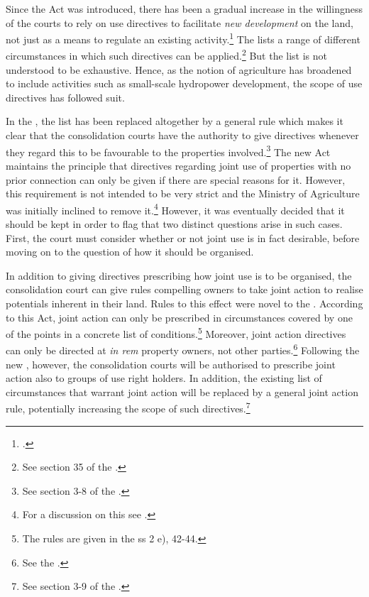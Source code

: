 Since the Act was introduced, there has been a gradual increase in the willingness of the courts to rely on use directives to facilitate \emph{new development} on the land, not just as a means to regulate an existing activity.\footcite[103]{otprp57} The \cite{lca79} lists a range of different circumstances in which such directives can be applied.\footnote{See section 35 of the \cite{lca79}.} But the list is not understood to be exhaustive. Hence, as the notion of agriculture has broadened to include activities such as small-scale hydropower development, the scope of use directives has followed suit.

In the \cite{lca13}, the list has been replaced altogether by a general rule which makes it clear that the consolidation courts have the authority to give directives whenever they regard this to be favourable to the properties involved.\footnote{See section 3-8 of the \cite{lca13}.}  The new Act maintains the principle that directives regarding joint use of properties with no prior connection can only be given if there are special reasons for it. However, this requirement is not intended to be very strict and the Ministry of Agriculture was initially inclined to remove it.\footnote{For a discussion on this see \cite[140-141]{prop12}.} However, it was eventually decided that it should be kept in order to flag that two distinct questions arise in such cases. First, the court must consider whether or not joint use is in fact desirable, before moving on to the question of how it should be organised.

In addition to giving directives prescribing how joint use is to be organised, the consolidation court can give rules compelling owners to take joint action to realise potentials inherent in their land. Rules to this effect were novel to the \cite{lca79}. According to this Act, joint action can only be prescribed in circumstances covered by one of the points in a concrete list of conditions.\footnote{The rules are given in the \cite{lca79} ss 2 e), 42-44.} Moreover, joint action directives can only be directed at {\it in rem} property owners, not other parties.\footnote{See the \dni\cite[34 a)]{lca79}.} Following the new \cite{lca13}, however, the consolidation courts will be authorised to prescribe joint action also to groups of use right holders. In addition, the existing list of circumstances that warrant joint action will be replaced by a general joint action rule, potentially increasing the scope of such directives.\footnote{See section 3-9 of the \cite{lca13}.}

